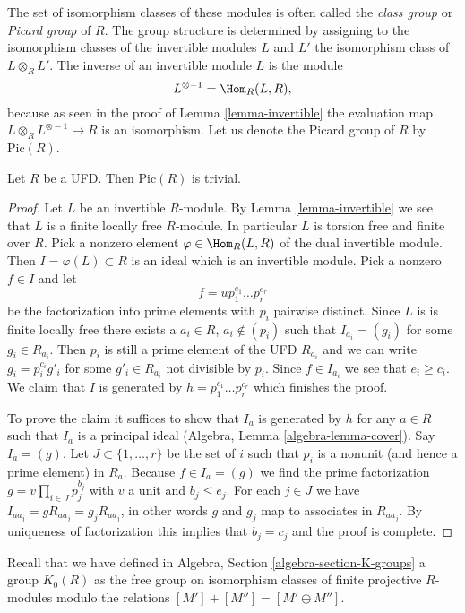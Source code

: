 \noindent
The set of isomorphism classes of these
modules is often called the {\it class group} or {\it Picard group}
of $R$. The group structure is determined by assigning to
the isomorphism classes of the invertible modules $L$ and $L'$
the isomorphism class of $L \otimes_R L'$.
The inverse of an invertible module $L$ is the module
$$
L^{\otimes -1} = \Hom_R(L, R),
$$
because as seen in the proof of Lemma \ref{lemma-invertible}
the evaluation map $L \otimes_R L^{\otimes -1} \to R$ is an isomorphism.
Let us denote the Picard group of $R$ by $\text{Pic}(R)$.

\begin{lemma}
\label{lemma-UFD-Pic-trivial}
Let $R$ be a UFD. Then $\text{Pic}(R)$ is trivial.
\end{lemma}

\begin{proof}
Let $L$ be an invertible $R$-module. By Lemma \ref{lemma-invertible}
we see that $L$ is a finite locally free $R$-module. In particular
$L$ is torsion free and finite over $R$. Pick a nonzero element
$\varphi \in \Hom_R(L, R)$ of the dual invertible module.
Then $I = \varphi(L) \subset R$ is an ideal which is an invertible module.
Pick a nonzero $f \in I$ and let
$$
f = u p_1^{e_1} \ldots p_r^{e_r}
$$
be the factorization into prime elements with $p_i$ pairwise distinct.
Since $L$ is is finite locally free there exists a $a_i \in R$,
$a_i \not \in (p_i)$ such that $I_{a_i} = (g_i)$ for some $g_i \in R_{a_i}$.
Then $p_i$ is still a prime element of the UFD $R_{a_i}$ and
we can write $g_i = p_i^{c_i} g'_i$ for some $g'_i \in R_{a_i}$
not divisible by $p_i$. Since $f \in I_{a_i}$ we see that $e_i \geq c_i$.
We claim that $I$ is generated by $h = p_1^{c_1} \ldots p_r^{c_r}$ which
finishes the proof.

\medskip\noindent
To prove the claim it suffices to show that $I_a$ is generated by $h$
for any $a \in R$ such that $I_a$ is a principal ideal
(Algebra, Lemma \ref{algebra-lemma-cover}). Say $I_a = (g)$.
Let $J \subset \{1, \ldots, r\}$ be the set of $i$ such that
$p_i$ is a nonunit (and hence a prime element) in $R_a$. Because
$f \in I_a = (g)$ we find the prime factorization
$g = v \prod_{i \in J} p_j^{b_j}$
with $v$ a unit and $b_j \leq e_j$. For each $j \in J$ we have
$I_{aa_j} = g R_{aa_j} = g_j R_{aa_j}$, in other words
$g$ and $g_j$ map to associates in $R_{aa_j}$. By uniqueness
of factorization this implies that $b_j = c_j$ and the proof is complete.
\end{proof}

\noindent
Recall that we have defined in Algebra, Section \ref{algebra-section-K-groups}
a group $K_0(R)$ as the free group on isomorphism classes
of finite projective $R$-modules modulo the relations
$[M'] + [M''] = [M' \oplus M'']$.

